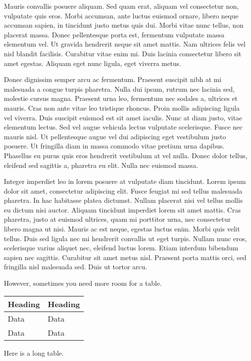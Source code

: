 \documentclass{article}
\begin{document}
Mauris convallis posuere aliquam. Sed quam erat, aliquam vel consectetur non, vulputate quis eros. Morbi accumsan, ante luctus euismod ornare, libero neque accumsan sapien, in tincidunt justo metus quis dui. Morbi vitae nunc tellus, non placerat massa. Donec pellentesque porta est, fermentum vulputate massa elementum vel. Ut gravida hendrerit neque sit amet mattis. Nam ultrices felis vel nisl blandit facilisis. Curabitur vitae enim mi. Duis lacinia consectetur libero sit amet egestas. Aliquam eget nunc ligula, eget viverra metus.

Donec dignissim semper arcu ac fermentum. Praesent suscipit nibh at mi malesuada a congue turpis pharetra. Nulla dui ipsum, rutrum nec lacinia sed, molestie cursus magna. Praesent urna leo, fermentum nec sodales a, ultrices et mauris. Cras non ante vitae leo tristique rhoncus. Proin mollis adipiscing ligula vel viverra. Duis suscipit euismod est sit amet iaculis. Nunc at diam justo, vitae elementum lectus. Sed vel augue vehicula lectus vulputate scelerisque. Fusce nec mauris nisl. Ut pellentesque augue vel dui adipiscing eget vestibulum justo posuere. Ut fringilla diam in massa commodo vitae pretium urna dapibus. Phasellus eu purus quis eros hendrerit vestibulum at vel nulla. Donec dolor tellus, eleifend sed sagittis a, pharetra eu elit. Nulla nec euismod massa.

Integer imperdiet leo in lorem posuere at vulputate diam tincidunt. Lorem ipsum dolor sit amet, consectetur adipiscing elit. Fusce feugiat mi sed tellus malesuada pharetra. In hac habitasse platea dictumst. Nullam placerat nisi vel tellus mollis eu dictum nisi auctor. Aliquam tincidunt imperdiet lorem sit amet mattis. Cras pharetra, justo at euismod ultrices, quam mi porttitor urna, nec consectetur libero magna ut nisi. Mauris ac est neque, egestas luctus enim. Morbi quis velit tellus. Duis sed ligula nec mi hendrerit convallis ut eget turpis. Nullam nunc eros, scelerisque varius aliquet nec, eleifend luctus lorem. Etiam interdum bibendum sapien nec sagittis. Curabitur sit amet metus nisl. Praesent porta mattis orci, sed fringilla nisl malesuada sed. Duis ut tortor arcu.

However, sometimes you need more room for a table.
\begin{fullwidthtable}
\begin{tabularx}{\linewidth}{XX}
\toprule
Heading & Heading \\
\midrule
Data & Data \\
Data & Data \\
\bottomrule
\end{tabularx}
\caption{Here is a long table.}
\end{fullwidthtable}
\end{document}
